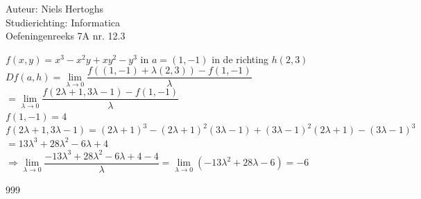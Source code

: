 \documentclass[a4paper]{article}
\begin{document}
\noindent \large Auteur: Niels Hertoghs \\
\noindent \large Studierichting: Informatica \\
\noindent \large Oefeningenreeks 7A nr. 12.3 \\

\medskip

\normalsize

$f(x,y) = x^3 - x^2y + xy^2 - y^3$ in $ a = (1,-1)$ in de richting $h(2,3)$ \\

$Df(a,h) = \lim\limits_{\lambda\rightarrow 0}\dfrac{f((1,-1) + \lambda (2,3)) - f(1,-1)}{\lambda}$ \\

$ = \lim\limits_{\lambda\rightarrow 0}\dfrac{f(2\lambda + 1,3\lambda -1) - f(1,-1)}{\lambda}$ \\

$f(1,-1) = 4$\\

$f(2\lambda + 1,3\lambda -1) = (2\lambda+1)^3 - (2\lambda+1)^2 (3\lambda-1) + (3\lambda-1)^2 (2\lambda+1)-(3\lambda-1)^3$\\

$ = 13\lambda^3 + 28\lambda^2 - 6\lambda + 4$\\

$\Rightarrow \lim\limits_{\lambda\rightarrow 0} \dfrac{-13\lambda^3 + 28\lambda^2 - 6\lambda + 4 -4}{\lambda} = \lim\limits_{\lambda\rightarrow 0} (-13\lambda^2 + 28\lambda - 6) = -6$\\


\begin{thebibliography}{999}
\end{thebibliography}
\end{document}

